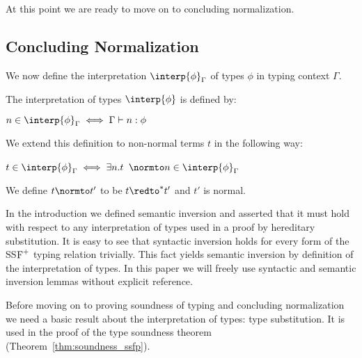 At this point we are ready to move on to concluding normalization.

\subsection{Concluding Normalization}
\label{subsec:concluding_normalization_ssfp}
We now define the interpretation $\interp{\phi}_\Gamma$ of types $\phi$ in typing context 
$\Gamma$.  
\begin{definition}
  \label{def:interpretation_types_ssfp}
  The interpretation of types $\interp{\phi}$ is defined by:
  \begin{center}
    $n \in \interp{\phi}_\Gamma \iff \Gamma \vdash n:\phi$
  \end{center}
  We extend this definition to non-normal terms $t$ in the following way:
  \begin{center}
    $t \in \interp{\phi}_\Gamma \iff \exists n.t$ $\normto n \in \interp{\phi}_\Gamma$
  \end{center}
\end{definition}
We define $t \normto t'$ to be $t \redto^{*} t'$ and $t'$ is normal.

In the introduction we defined semantic inversion and asserted that it
must hold with respect to any interpretation of types used in a proof
by hereditary substitution.  It is easy to see that syntactic
inversion holds for every form of the SS$\mbox{F}^{+}$ typing relation
trivially.  This fact yields semantic inversion by definition of the
interpretation of types.  In this paper we will freely use syntactic
and semantic inversion lemmas without explicit reference.

Before moving on to proving soundness of typing and concluding
normalization we need a basic result about the interpretation of
types: type substitution.  It is used in the proof of the type
soundness theorem (Theorem~\ref{thm:soundness_ssfp}).

